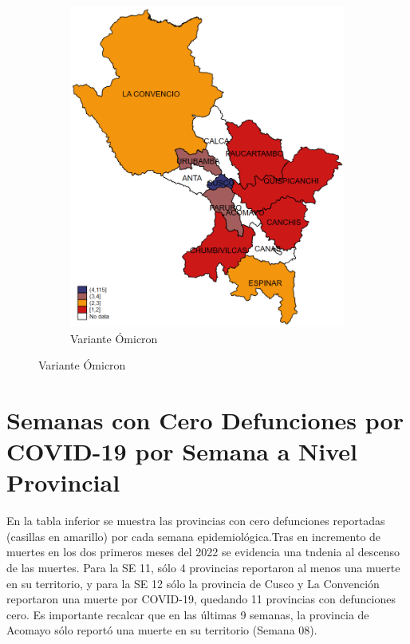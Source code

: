 \documentclass[12pt,a4paper,openany]{book}
\begin{document}
\begin{figure}[h]
\begin{subfigure}[b]{0.40\textwidth}
				\includegraphics[width=\textwidth]{../figuras/variantes_provincial_omicron.png}
				\caption{Variante Ómicron}
			\end{subfigure}
			\end{figure}

\clearpage


\clearpage
	\section*{Semanas con Cero Defunciones por COVID-19 por Semana a Nivel Provincial}
	
\noindent En la tabla inferior se muestra las provincias con cero defunciones reportadas (casillas en amarillo) por cada semana epidemiológica.Tras en incremento de muertes en los dos primeros meses del 2022 se evidencia una tndenia al descenso de las muertes.  Para la SE 11, sólo 4 provincias reportaron al menos una  muerte en su territorio, y para la SE 12 sólo la provincia de Cusco y La Convención reportaron una muerte por COVID-19, quedando 11 provincias con defunciones cero. Es importante recalcar que en las últimas 9 semanas, la provincia de Acomayo sólo reportó una muerte en su territorio (Semana 08). 
  
\end{document}
